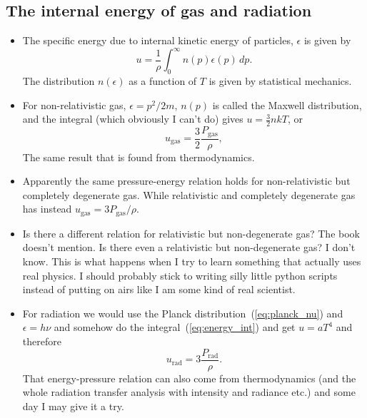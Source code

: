 \documentclass[10pt,amsmath,amssymb,aps,pra]{revtex4-2}
\newcommand{\sub}[1]{_{\text{#1}}}
\begin{document}
\subsection{The internal energy of gas and radiation}
\begin{itemize}
\item The specific energy due to internal kinetic energy of particles,
$\epsilon$ is given by
\begin{equation}\label{eq:energy_int}
u = \frac{1}{\rho}\int_0^{\infty}n(p)\epsilon(p)\,dp.
\end{equation}
The distribution $n(\epsilon)$ as a function of $T$ is given by statistical
mechanics.

\item For non-relativistic gas, $\epsilon=p^2/2m$, $n(p)$ is called the Maxwell
distribution, and the integral (which obviously I can't do) gives
$u=\frac{3}{2}nkT$, or
\begin{equation}
u\sub{gas} = \frac{3}{2}\frac{P\sub{gas}}{\rho},
\end{equation}
The same result that is found from thermodynamics.

\item Apparently the same pressure-energy relation holds for non-relativistic
but completely degenerate gas. While relativistic and completely degenerate gas
has instead $u\sub{gas}=3P\sub{gas}/\rho$.

\item Is there a different relation for relativistic but non-degenerate gas? The
book doesn't mention. Is there even a relativistic but non-degenerate gas? I
don't know. This is what happens when I try to learn something that actually
uses real physics. I should probably stick to writing silly little python
scripts instead of putting on airs like I am some kind of real scientist.

\item For radiation we would use the Planck distribution~(\ref{eq:planck_nu})
and $\epsilon=h\nu$ and somehow do the integral~(\ref{eq:energy_int}) and get
$u=aT^4$ and therefore
\begin{equation}
u\sub{rad} = 3\frac{P\sub{rad}}{\rho}.
\end{equation}
That energy-pressure relation can also come from thermodynamics (and the whole
radiation transfer analysis with intensity and radiance etc.) and some day I may
give it a try.

\end{itemize}
\end{document}
